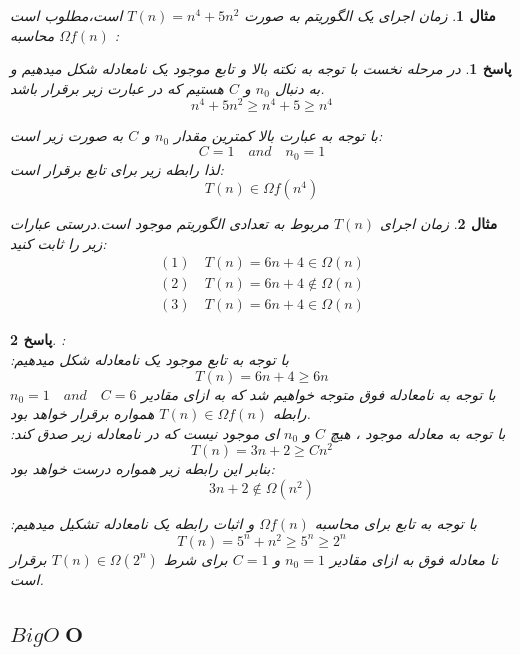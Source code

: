 \documentclass[12pt]{article}
\newtheorem{question}{مثال}[section]
\newtheorem{answer}{پاسخ}[section]
\begin{document}
\newpage

\begin{question}
زمان اجرای یک الگوریتم به صورت $T(n) = n^4 + 5n^2 $ است،مطلوب است محاسبه $\Omega f(n)$ :
\end{question}

\begin{answer}
در مرحله نخست با توجه به نکته بالا و تابع موجود یک نامعادله شکل میدهیم و به دنبال $n_0$ و $C$ هستیم که در عبارت زیر برقرار باشد.
\[
n^4 + 5n^2 \ge n^4 + 5 \ge n^4
\]

با توجه به عبارت بالا کمترین مقدار $n_0$
و $C$ به صورت زیر است:\\
\[
C = 1 \quad and \quad n_0 = 1
\]
لذا رابطه زیر برای تابع برقرار است:\\
\[
T(n) \in \Omega f(n^4)
\]
\end{answer}

\begin{question}
زمان اجرای $T(n)$ مربوط به تعدادی الگوریتم موجود است.درستی عبارات زیر را ثابت کنید:
\begin{align*}
(1)\ &T(n) = 6n + 4 \in \Omega(n)\\
(2)\ &T(n) = 6n + 4 \notin \Omega(n)\\
(3)\ &T(n) = 6n + 4 \in \Omega(n)
\end{align*}
\end{question}

\begin{answer}
:\\
 با توجه به تابع موجود یک نامعادله شکل میدهیم:
\[T(n)= 6n + 4 \ge 6n\]
با توجه به نامعادله فوق متوجه خواهیم شد که به ازای مقادیر
$n_0 = 1\quad and \quad C=6$
رابطه 
$T(n) \in \Omega f(n)$
همواره برقرار خواهد بود.\\
\newline
{} با توجه به معادله موجود ، هیچ $C$ و $n_0$ ای موجود نیست که در نامعادله زیر صدق کند:
\[
T(n)= 3n + 2 \ge Cn^2
\]
بنابر این رابطه زیر همواره درست خواهد بود:
\[
3n + 2 \notin \Omega (n^2)
\]

\noindent
{} با توجه به تابع برای محاسبه 
$\Omega f(n)$
و اثبات رابطه یک نامعادله تشکیل میدهیم:
\[
T(n)= 5^n + n^2 \ge 5^n \ge 2^n
\]
نا معادله فوق به ازای مقادیر $n_0 = 1$ و $C=1$ برای شرط 
$T(n) \in \Omega (2^n)$
برقرار است.
\end{answer}

\newpage


\subsection{$Big O \; \mathbf{O}$}
\end{document}

